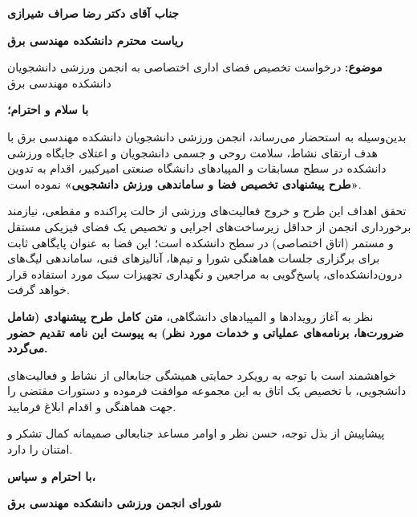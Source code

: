\documentclass[12pt,a4paper]{article}
\newcommand{\RecipientGender}{جناب آقای} %
\newcommand{\RecipientName}{دکتر رضا صراف شیرازی}
\newcommand{\RecipientTitle}{ریاست محترم دانشکده مهندسی برق}
\newcommand{\SenderTitle}{انجمن ورزشی دانشجویان دانشکده مهندسی برق}
\newcommand{\SenderCouncilTitle}{شورای انجمن ورزشی دانشکده مهندسی برق}
\newcommand{\LetterSubject}{درخواست تخصیص فضای اداری اختصاصی به انجمن ورزشی دانشجویان دانشکده مهندسی برق}
\begin{document}
{\fontsize{13pt}{24pt}\selectfont
\noindent
\textbf{\RecipientGender{} \RecipientName} \par
\textbf{\RecipientTitle} \par\vspace{0.45cm}
\textbf{موضوع:} \LetterSubject \par\vspace{0.45cm}
\textbf{با سلام و احترام؛} \par\vspace{0.35cm}
بدین‌وسیله به استحضار می‌رساند، \SenderTitle{} با هدف ارتقای نشاط، سلامت روحی و جسمی دانشجویان و اعتلای جایگاه ورزشی دانشکده در سطح مسابقات و المپیادهای دانشگاه صنعتی امیرکبیر، اقدام به تدوین \textbf{«طرح پیشنهادی تخصیص فضا و ساماندهی ورزش دانشجویی»} نموده است.

\vspace{0.35cm}
تحقق اهداف این طرح و خروج فعالیت‌های ورزشی از حالت پراکنده و مقطعی، نیازمند برخورداری انجمن از حداقل زیرساخت‌های اجرایی و تخصیص یک فضای فیزیکی مستقل و مستمر (اتاق اختصاصی) در سطح دانشکده است؛ این فضا به عنوان پایگاهی ثابت برای برگزاری جلسات هماهنگی شورا و تیم‌ها، آنالیزهای فنی، ساماندهی لیگ‌های درون‌دانشکده‌ای، پاسخ‌گویی به مراجعین و نگهداری تجهیزات سبک مورد استفاده قرار خواهد گرفت.

\vspace{0.35cm}
نظر به آغاز رویدادها و المپیادهای دانشگاهی، \textbf{متن کامل طرح پیشنهادی (شامل ضرورت‌ها، برنامه‌های عملیاتی و خدمات مورد نظر) به پیوست این نامه تقدیم حضور می‌گردد.}

\vspace{0.35cm}
خواهشمند است با توجه به رویکرد حمایتی همیشگی جنابعالی از نشاط و فعالیت‌های دانشجویی، با تخصیص یک اتاق به این مجموعه موافقت فرموده و دستورات مقتضی را جهت هماهنگی و اقدام ابلاغ فرمایید.

\vspace{0.35cm}
پیشاپیش از بذل توجه، حسن نظر و اوامر مساعد جنابعالی صمیمانه کمال تشکر و امتنان را دارد.

\vspace{0.9cm}
\begin{flushleft}
    \textbf{با احترام و سپاس،} \par\vspace{0.2cm}
    \textbf{\SenderCouncilTitle}
\end{flushleft}
}
\end{document}
